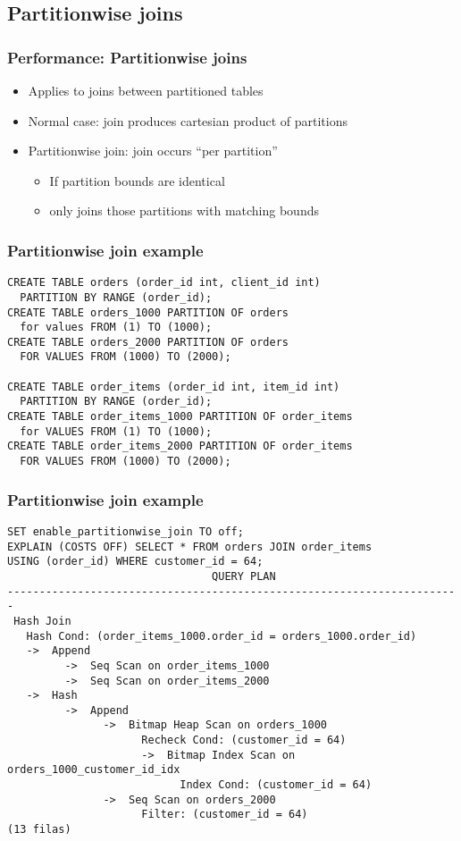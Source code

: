 \subsection{Partitionwise joins}
\begin{frame}
  \frametitle{Performance: Partitionwise joins}

  \begin{itemize}
    \item Applies to joins between partitioned tables
    \item Normal case: join produces cartesian product of partitions
    \item Partitionwise join: join occurs ``per partition''
      \begin{itemize}
    	\item If partition bounds are identical
	\item only joins those partitions with matching bounds
      \end{itemize}
  \end{itemize}
\end{frame}

\begin{frame}[fragile]
  \frametitle{Partitionwise join example}

  \footnotesize
  \begin{lstlisting}
CREATE TABLE orders (order_id int, client_id int)
  PARTITION BY RANGE (order_id);
CREATE TABLE orders_1000 PARTITION OF orders
  for values FROM (1) TO (1000);
CREATE TABLE orders_2000 PARTITION OF orders
  FOR VALUES FROM (1000) TO (2000);

CREATE TABLE order_items (order_id int, item_id int)
  PARTITION BY RANGE (order_id);
CREATE TABLE order_items_1000 PARTITION OF order_items
  for VALUES FROM (1) TO (1000);
CREATE TABLE order_items_2000 PARTITION OF order_items
  FOR VALUES FROM (1000) TO (2000);
  \end{lstlisting}

\end{frame}

\begin{frame}[fragile]
  \frametitle{Partitionwise join example}

\footnotesize
  \begin{lstlisting}
SET enable_partitionwise_join TO off;
EXPLAIN (COSTS OFF) SELECT * FROM orders JOIN order_items
USING (order_id) WHERE customer_id = 64;
                                QUERY PLAN                                
-----------------------------------------------------------------------
 Hash Join
   Hash Cond: (order_items_1000.order_id = orders_1000.order_id)
   ->  Append
         ->  Seq Scan on order_items_1000
         ->  Seq Scan on order_items_2000
   ->  Hash
         ->  Append
               ->  Bitmap Heap Scan on orders_1000
                     Recheck Cond: (customer_id = 64)
                     ->  Bitmap Index Scan on orders_1000_customer_id_idx
                           Index Cond: (customer_id = 64)
               ->  Seq Scan on orders_2000
                     Filter: (customer_id = 64)
(13 filas)
  \end{lstlisting}

\end{frame}


